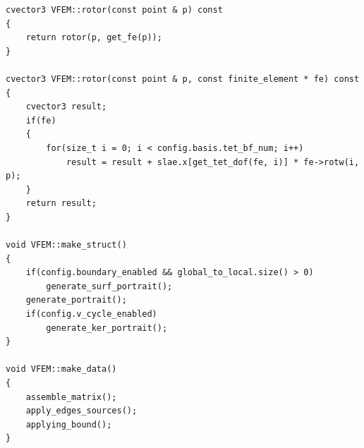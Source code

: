 \documentclass[a4paper,12pt]{article}
\begin{document}
\begin{singlespace}
\begin{tiny}
\begin{verbatim}
cvector3 VFEM::rotor(const point & p) const
{
    return rotor(p, get_fe(p));
}

cvector3 VFEM::rotor(const point & p, const finite_element * fe) const
{
    cvector3 result;
    if(fe)
    {
        for(size_t i = 0; i < config.basis.tet_bf_num; i++)
            result = result + slae.x[get_tet_dof(fe, i)] * fe->rotw(i, p);
    }
    return result;
}

void VFEM::make_struct()
{
    if(config.boundary_enabled && global_to_local.size() > 0)
        generate_surf_portrait();
    generate_portrait();
    if(config.v_cycle_enabled)
        generate_ker_portrait();
}

void VFEM::make_data()
{
    assemble_matrix();
    apply_edges_sources();
    applying_bound();
}

\end{verbatim}
\end{tiny}
\end{singlespace}

\end{document}
